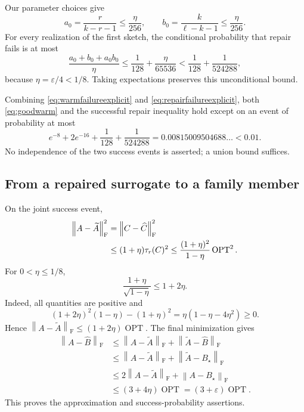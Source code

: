 \documentclass[11pt]{article}
\numberwithin{equation}{section}
\theoremstyle{remark}
\newcommand{\OPT}{\operatorname{OPT}}
\newcommand{\norm}[1]{\left\lVert #1\right\rVert_{\mathrm F}}
\begin{document}
Our parameter choices give
\[
 a_0=\frac{r}{k-r-1}\le\frac{\eta}{256},\qquad
 b_0=\frac{k}{\ell-k-1}\le\frac{\eta}{256}.
\]
For every realization of the first sketch, the conditional probability that repair fails is at most
\begin{equation}\label{eq:repairfailureexplicit}
 \frac{a_0+b_0+a_0b_0}{\eta}
 \le\frac1{128}+\frac{\eta}{65536}
 <\frac1{128}+\frac1{524288},
\end{equation}
because $\eta=\varepsilon/4<1/8$. Taking expectations preserves this unconditional bound.

Combining \eqref{eq:warmfailureexplicit} and \eqref{eq:repairfailureexplicit}, both \eqref{eq:goodwarm} and the successful repair inequality hold except on an event of probability at most
\begin{equation}\label{eq:failuretotal}
 e^{-8}+2e^{-16}+\frac1{128}+\frac1{524288}
 =0.00815009504688\ldots<0.01.
\end{equation}
No independence of the two success events is asserted; a union bound suffices.

\subsection{From a repaired surrogate to a family member}
On the joint success event,
\begin{align}
 \norm{A-\widetilde A}^2
 &=\norm{C-\widehat C}^2\notag\\
 &\le(1+\eta)\tau_r(C)^2
 \le\frac{(1+\eta)^2}{1-\eta}\OPT^2.\label{eq:surrogate}
\end{align}
For $0<\eta\le1/8$,
\begin{equation}\label{eq:scalarineq}
 \frac{1+\eta}{\sqrt{1-\eta}}\le1+2\eta.
\end{equation}
Indeed, all quantities are positive and
\[
 (1+2\eta)^2(1-\eta)-(1+\eta)^2
 =\eta(1-\eta-4\eta^2)\ge0.
\]
Hence $\norm{A-\widetilde A}\le(1+2\eta)\OPT$.
The final minimization gives
\begin{align*}
 \norm{A-\widehat B}
 &\le\norm{A-\widetilde A}+\norm{\widetilde A-\widehat B}\\
 &\le\norm{A-\widetilde A}+\norm{\widetilde A-B_\star}\\
 &\le2\norm{A-\widetilde A}+\norm{A-B_\star}\\
 &\le(3+4\eta)\OPT=(3+\varepsilon)\OPT.
\end{align*}
This proves the approximation and success-probability assertions.
\end{document}
